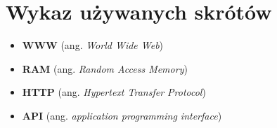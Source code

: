 \section*{Wykaz używanych skrótów}
\begin{itemize}
  \item \textbf{WWW} (ang. \textit{World Wide Web})
  \item \textbf{RAM} (ang. \textit{Random Access Memory})
  \item \textbf{HTTP} (ang. \textit{Hypertext Transfer Protocol})
  \item \textbf{API} (ang. \textit{application programming interface})
\end{itemize}
